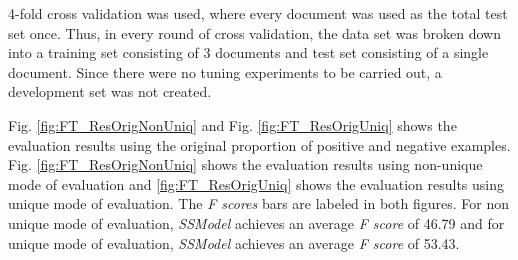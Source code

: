 4-fold cross validation was used, where every document was used as the total test set once. Thus, in every round of cross validation, the data set was broken down into a training set consisting of 3 documents and test set consisting of a single document. Since there were no tuning experiments to be carried out, a development set was not created.

Fig. \ref{fig:FT_ResOrigNonUniq} and Fig. \ref{fig:FT_ResOrigUniq} shows the evaluation results using the original proportion of positive and negative examples.  Fig. \ref{fig:FT_ResOrigNonUniq} shows the evaluation results using non-unique mode of evaluation and \ref{fig:FT_ResOrigUniq} shows the evaluation results using unique mode of evaluation. The \textit{F scores} bars are labeled in both figures. For non unique mode of evaluation, \textit{SSModel} achieves an average \textit{F score} of 46.79 and for unique mode of evaluation, \textit{SSModel} achieves an average \textit{F score} of 53.43.


